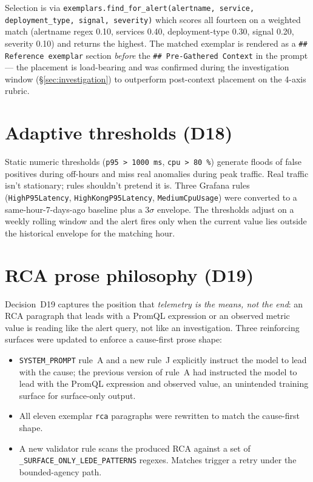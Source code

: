 \documentclass[11pt,a4paper,oneside]{report}
\begin{document}
Selection is via
\texttt{exemplars.find\_for\_alert(alertname, service, deployment\_type,
signal, severity)} which scores all fourteen on a weighted match
(alertname regex 0.10, services 0.40, deployment-type 0.30, signal
0.20, severity 0.10) and returns the highest.  The matched exemplar
is rendered as a \texttt{\#\# Reference exemplar} section
\emph{before} the \texttt{\#\# Pre-Gathered Context} in the prompt ---
the placement is load-bearing and was confirmed during the
investigation window (\S\ref{sec:investigation}) to outperform
post-context placement on the 4-axis rubric.

\section{Adaptive thresholds (D18)}

Static numeric thresholds (\texttt{p95 > 1000\,ms},
\texttt{cpu > 80\,\%}) generate floods of false positives during
off-hours and miss real anomalies during peak traffic.  Real traffic
isn't stationary; rules shouldn't pretend it is.  Three Grafana rules
(\texttt{HighP95Latency}, \texttt{HighKongP95Latency},
\texttt{MediumCpuUsage}) were converted to a same-hour-7-days-ago
baseline plus a $3\sigma$ envelope.  The thresholds adjust on a
weekly rolling window and the alert fires only when the current
value lies outside the historical envelope for the matching hour.

\section{RCA prose philosophy (D19)}

Decision~D19 captures the position that \emph{telemetry is the means,
not the end}: an RCA paragraph that leads with a PromQL expression
or an observed metric value is reading like the alert query, not like
an investigation.  Three reinforcing surfaces were updated to enforce
a cause-first prose shape:

\begin{itemize}
  \item \texttt{SYSTEM\_PROMPT} rule~A and a new rule~J explicitly
        instruct the model to lead with the cause; the previous version
        of rule~A had instructed the model to lead with the PromQL
        expression and observed value, an unintended training surface
        for surface-only output.
  \item All eleven exemplar \texttt{rca} paragraphs were rewritten to
        match the cause-first shape.
  \item A new validator rule scans the produced RCA against a set of
        \texttt{\_SURFACE\_ONLY\_LEDE\_PATTERNS} regexes.  Matches
        trigger a retry under the bounded-agency path.
\end{itemize}
\end{document}
